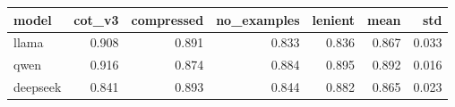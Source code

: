 \begin{tabular}{lrrrrrr}
\toprule
model & cot_v3 & compressed & no_examples & lenient & mean & std \\
\midrule
llama & 0.908 & 0.891 & 0.833 & 0.836 & 0.867 & 0.033 \\
qwen & 0.916 & 0.874 & 0.884 & 0.895 & 0.892 & 0.016 \\
deepseek & 0.841 & 0.893 & 0.844 & 0.882 & 0.865 & 0.023 \\
\bottomrule
\end{tabular}
